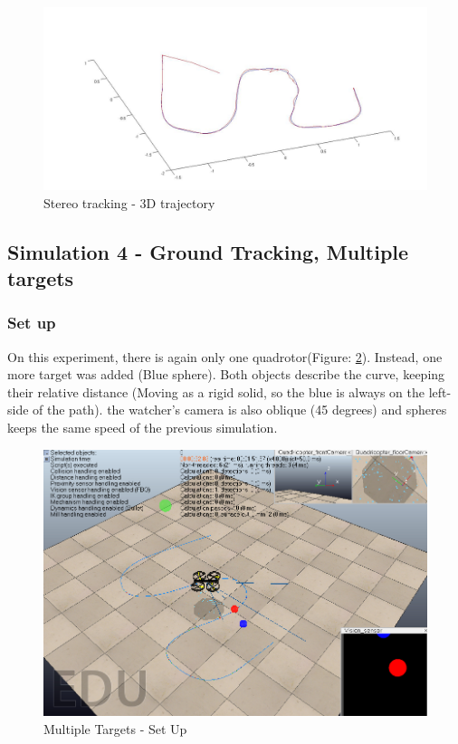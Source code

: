 \begin{figure}[htp]
		\centering
		\includegraphics[width=0.7\linewidth]{../Images/c3/sim3_traj_both_3d}
		\caption{Stereo tracking - 3D trajectory}
		\label{fig:sim3_traj_both_3d}
\end{figure}

\subsection{Simulation 4 - Ground Tracking, Multiple targets}
\subsubsection{Set up}
 On this experiment, there is again only one quadrotor(Figure: \ref{fig:sim4_set_up}). Instead, one more target was added (Blue sphere). Both objects describe the curve, keeping their relative distance (Moving as a rigid solid, so the blue is always on the left-side of the path). the watcher's camera is also oblique (45 degrees) and spheres keeps the same speed of the previous simulation.
 
\begin{figure}[htp]
	\centering
	\includegraphics[width=0.6\linewidth]{../Images/c3/sim4_set_up}
	\caption{Multiple Targets - Set Up}
	\label{fig:sim4_set_up}
\end{figure}

